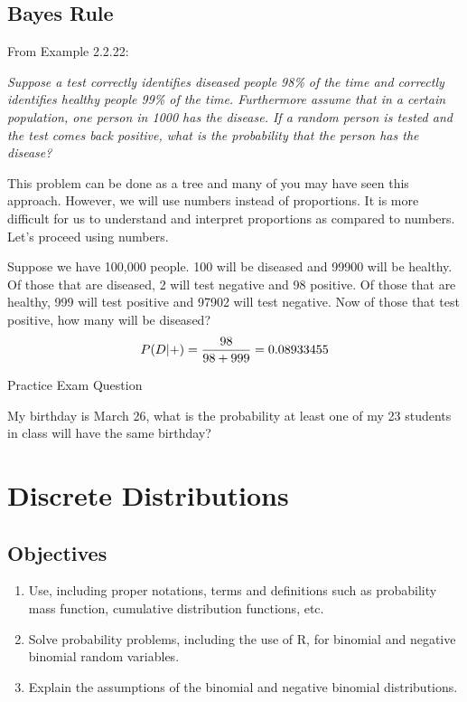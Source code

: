 \documentclass[]{book}
\providecommand{\tightlist}{%
  \setlength{\itemsep}{0pt}\setlength{\parskip}{0pt}}
\theoremstyle{definition}
\theoremstyle{definition}
\theoremstyle{definition}
\theoremstyle{remark}
\begin{document}
\subsection{Bayes Rule}\label{bayes-rule}

From Example 2.2.22:

\emph{Suppose a test correctly identifies diseased people 98\% of the
time and correctly identifies healthy people 99\% of the time.
Furthermore assume that in a certain population, one person in 1000 has
the disease. If a random person is tested and the test comes back
positive, what is the probability that the person has the disease?}

This problem can be done as a tree and many of you may have seen this
approach. However, we will use numbers instead of proportions. It is
more difficult for us to understand and interpret proportions as
compared to numbers. Let's proceed using numbers.

Suppose we have 100,000 people. 100 will be diseased and 99900 will be
healthy. Of those that are diseased, 2 will test negative and 98
positive. Of those that are healthy, 999 will test positive and 97902
will test negative. Now of those that test positive, how many will be
diseased? \[P(D|+)={98 \over 98+999}=0.08933455\]

Practice Exam Question

My birthday is March 26, what is the probability at least one of my 23
students in class will have the same birthday?

\hypertarget{L7}{\section{Discrete Distributions}\label{L7}}

\subsection{Objectives}\label{objectives-6}

\begin{enumerate}
\def\labelenumi{\arabic{enumi}.}
\tightlist
\item
  Use, including proper notations, terms and definitions such as
  probability mass function, cumulative distribution functions, etc.\\
\item
  Solve probability problems, including the use of R, for binomial and
  negative binomial random variables.\\
\item
  Explain the assumptions of the binomial and negative binomial
  distributions.
\end{enumerate}
\end{document}

